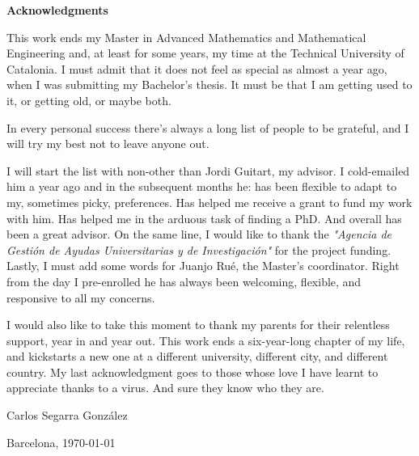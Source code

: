 \vspace*{2cm}
\Huge
\textbf{Acknowledgments} \label{sec:acknowledgments}
\normalsize

\vspace{1cm}

This work ends my Master in Advanced Mathematics and Mathematical Engineering and, at least for some years, my time at the Technical University of Catalonia.
I must admit that it does not feel as special as almost a year ago, when I was submitting my Bachelor's thesis.
It must be that I am getting used to it, or getting old, or maybe both.

In every personal success there's always a long list of people to be grateful, and I will try my best not to leave anyone out.

I will start the list with non-other than Jordi Guitart, my advisor.
I cold-emailed him a year ago and in the subsequent months he: has been flexible to adapt to my, sometimes picky, preferences.
Has helped me receive a grant to fund my work with him.
Has helped me in the arduous task of finding a PhD.
And overall has been a great advisor.
On the same line, I would like to thank the \textit{"Agencia de Gesti\'on de Ayudas Universitarias y de Investigaci\'on"} for the project funding.
Lastly, I must add some words for Juanjo Ru\'e, the Master's coordinator.
Right from the day I pre-enrolled he has always been welcoming, flexible, and responsive to all my concerns.

I would also like to take this moment to thank my parents for their relentless support, year in and year out.
This work ends a six-year-long chapter of my life, and kickstarts a new one at a different university, different city, and different country.
My last acknowledgment goes to those whose love I have learnt to appreciate thanks to a virus.
And sure they know who they are.

\vspace{1cm}

\begin{flushright}
Carlos Segarra Gonz\'alez

Barcelona, \today
\end{flushright}

\vspace*{\fill}
